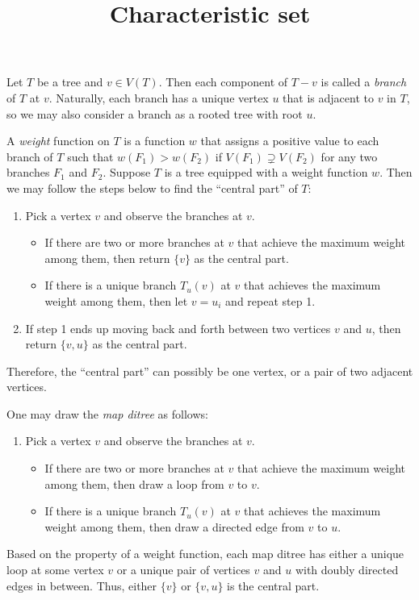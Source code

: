 \documentclass{article}
\title{Characteristic set}
\date{\vspace{-1cm}}
\theoremstyle{definition}
\begin{document}
\maketitle
\large

Let $T$ be a tree and $v\in V(T)$.  Then each component of $T - v$ is called a \emph{branch} of $T$ at $v$.  Naturally, each branch has a unique vertex $u$ that is adjacent to $v$ in $T$, so we may also consider a branch as a rooted tree with root $u$.  

A \emph{weight} function on $T$ is a function $w$ that assigns a positive value to each branch of $T$ such that $w(F_1) > w(F_2)$ if $V(F_1) \supsetneq V(F_2)$ for any two branches $F_1$ and $F_2$.  Suppose $T$ is a tree equipped with a weight function $w$.  Then we may follow the steps below to find the ``central part'' of $T$:
\begin{enumerate}
\item Pick a vertex $v$ and observe the branches at $v$.  
    \begin{itemize}
    \item If there are two or more branches at $v$ that achieve the maximum weight among them, then return $\{v\}$ as the central part.
    \item If there is a unique branch $T_{u}(v)$ at $v$ that achieves the maximum weight among them, then let $v = u_i$ and repeat step 1.
    \end{itemize}
\item If step 1 ends up moving back and forth between two vertices $v$ and $u$, then return $\{v,u\}$ as the central part.
\end{enumerate}
Therefore, the ``central part'' can possibly be one vertex, or a pair of two adjacent vertices.  

One may draw the \emph{map ditree} as follows:  
\begin{enumerate}
\item Pick a vertex $v$ and observe the branches at $v$.  
    \begin{itemize}
    \item If there are two or more branches at $v$ that achieve the maximum weight among them, then draw a loop from $v$ to $v$.
    \item If there is a unique branch $T_{u}(v)$ at $v$ that achieves the maximum weight among them, then draw a directed edge from $v$ to $u$.  
    \end{itemize}    
\end{enumerate}
Based on the property of a weight function, each map ditree has either a unique loop at some vertex $v$ or a unique pair of vertices $v$ and $u$ with doubly directed edges in between.  Thus, either $\{v\}$ or $\{v,u\}$ is the central part.  
\end{document}
